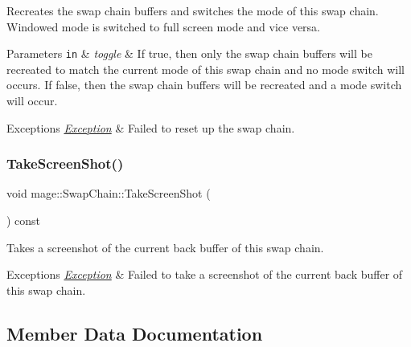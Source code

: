 Recreates the swap chain buffers and switches the mode of this swap chain. Windowed mode is switched to full screen mode and vice versa.


\begin{DoxyParams}[1]{Parameters}
\mbox{\tt in}  & {\em toggle} & If {\ttfamily true}, then only the swap chain buffers will be recreated to match the current mode of this swap chain and no mode switch will occurs. If {\ttfamily false}, then the swap chain buffers will be recreated and a mode switch will occur. \\
\hline
\end{DoxyParams}

\begin{DoxyExceptions}{Exceptions}
{\em \hyperlink{classmage_1_1_exception}{Exception}} & Failed to reset up the swap chain. \\
\hline
\end{DoxyExceptions}
\hypertarget{classmage_1_1_swap_chain_a23a4618b5104203c5a5c962696ae3b53}{}\label{classmage_1_1_swap_chain_a23a4618b5104203c5a5c962696ae3b53} 
\subsubsection{\texorpdfstring{Take\+Screen\+Shot()}{TakeScreenShot()}}
{\footnotesize\ttfamily void mage\+::\+Swap\+Chain\+::\+Take\+Screen\+Shot (\begin{DoxyParamCaption}{ }\end{DoxyParamCaption}) const}

Takes a screenshot of the current back buffer of this swap chain.


\begin{DoxyExceptions}{Exceptions}
{\em \hyperlink{classmage_1_1_exception}{Exception}} & Failed to take a screenshot of the current back buffer of this swap chain. \\
\hline
\end{DoxyExceptions}


\subsection{Member Data Documentation}
\hypertarget{classmage_1_1_swap_chain_a169f9613c42c3cad0ea83e9535676cd0}{}\label{classmage_1_1_swap_chain_a169f9613c42c3cad0ea83e9535676cd0} 
